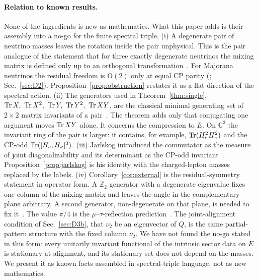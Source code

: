 \paragraph{Relation to known results.}
None of the ingredients is new as mathematics. What this paper adds is their assembly into a no-go for the finite spectral triple.
(i) A degenerate pair of neutrino masses leaves the rotation inside the pair unphysical. This is the pair analogue of the statement that for three exactly degenerate neutrinos the mixing matrix is defined only up to an orthogonal transformation~\cite{brsm1999}. For Majorana neutrinos the residual freedom is $\mathrm{O}(2)$ only at equal CP parity (\cite{brsm1999}; Sec.~\ref{sec:D2}). Proposition~\ref{prop:obstruction} restates it as a flat direction of the spectral action.
(ii) The generators used in Theorem~\ref{thm:single}, $\operatorname{Tr} X,\ \operatorname{Tr} X^2,\ \operatorname{Tr} Y,\ \operatorname{Tr} Y^2,\ \operatorname{Tr} XY$, are the classical minimal generating set of $2\times2$ matrix invariants of a pair~\cite{sibirskii1968,drensky2005}. The theorem adds only that conjugating one argument moves $\operatorname{Tr} XY$ alone. It concerns the compression to $E$. On $\mathbb C^3$ the invariant ring of the pair is larger: it contains, for example, $\operatorname{Tr}(H_e^2H_\nu^2)$ and the CP-odd $\operatorname{Tr}([H_e,H_\nu]^3)$.
(iii) Jarlskog introduced the commutator as the measure of joint diagonalizability and its determinant as the CP-odd invariant~\cite{jarlskog1985}. Proposition~\ref{prop:jarlskog} is his identity with the charged-lepton masses replaced by the labels.
(iv) Corollary~\ref{cor:external} is the residual-symmetry statement in operator form. A $\mathbb Z_2$ generator with a degenerate eigenvalue fixes one column of the mixing matrix and leaves the angle in the complementary plane arbitrary. A second generator, non-degenerate on that plane, is needed to fix it~\cite{lam2008,fonsecagrimus2014,king2017}. The value $\pi/4$ is the $\mu$--$\tau$-reflection prediction~\cite{harrison2002,fhz2013}. The joint-alignment condition of Sec.~\ref{sec:D3b}, that $\nu_2$ be an eigenvector of $Q$, is the same partial-pattern structure with the fixed column $\nu_2$.
We have not found the no-go stated in this form: every unitarily invariant functional of the intrinsic sector data on $E$ is stationary at alignment, and its stationary set does not depend on the masses. We present it as known facts assembled in spectral-triple language, not as new mathematics.
